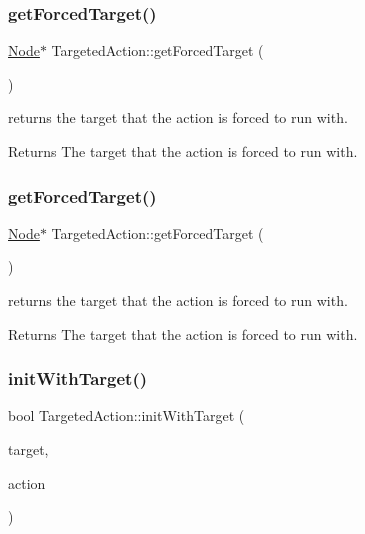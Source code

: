 \subsubsection{\texorpdfstring{get\+Forced\+Target()}{getForcedTarget()}\hspace{0.1cm}{\footnotesize\ttfamily [1/2]}}
{\footnotesize\ttfamily \hyperlink{classNode}{Node}$\ast$ Targeted\+Action\+::get\+Forced\+Target (\begin{DoxyParamCaption}{ }\end{DoxyParamCaption})\hspace{0.3cm}{\ttfamily [inline]}}

returns the target that the action is forced to run with.

\begin{DoxyReturn}{Returns}
The target that the action is forced to run with. 
\end{DoxyReturn}
\mbox{\label{classTargetedAction_a3cc3da2403fbc082d8799c867ba7ae38}} 
\subsubsection{\texorpdfstring{get\+Forced\+Target()}{getForcedTarget()}\hspace{0.1cm}{\footnotesize\ttfamily [2/2]}}
{\footnotesize\ttfamily \hyperlink{classNode}{Node}$\ast$ Targeted\+Action\+::get\+Forced\+Target (\begin{DoxyParamCaption}{ }\end{DoxyParamCaption})\hspace{0.3cm}{\ttfamily [inline]}}

returns the target that the action is forced to run with.

\begin{DoxyReturn}{Returns}
The target that the action is forced to run with. 
\end{DoxyReturn}
\mbox{\label{classTargetedAction_ab1de67f9331ac62396a6c22f7c7a6b67}} 
\subsubsection{\texorpdfstring{init\+With\+Target()}{initWithTarget()}\hspace{0.1cm}{\footnotesize\ttfamily [1/2]}}
{\footnotesize\ttfamily bool Targeted\+Action\+::init\+With\+Target (\begin{DoxyParamCaption}\item[{\hyperlink{classNode}{Node} $\ast$}]{target,  }\item[{\hyperlink{classFiniteTimeAction}{Finite\+Time\+Action} $\ast$}]{action }\end{DoxyParamCaption})}

